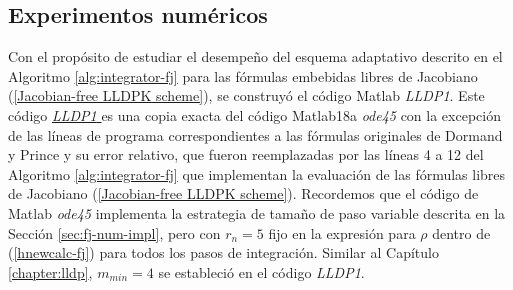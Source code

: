 \subsection{Experimentos numéricos}
Con el propósito de estudiar el desempeño del esquema adaptativo descrito en el Algoritmo \ref{alg:integrator-fj} para las fórmulas embebidas libres de Jacobiano (\ref{Jacobian-free LLDPK scheme}), se construyó el código Matlab \emph{LLDP1}. Este código \href{https://github.com/fsadannn/JF-LLDPschemes}{{\emph{LLDP1} \faExternalLink}} es una copia exacta del código Matlab18a \emph{ode45} \cite{shampine1997matlab} con la excepción de las líneas de programa correspondientes a las fórmulas originales de Dormand y Prince y su error relativo, que fueron reemplazadas por las líneas 4 a 12 del Algoritmo \ref{alg:integrator-fj} que implementan la evaluación de las fórmulas libres de Jacobiano (\ref{Jacobian-free LLDPK scheme}). Recordemos que el código de Matlab \emph{ode45} implementa la estrategia de tamaño de paso variable descrita en la Sección \ref{sec:fj-num-impl}, pero con $r_n=5$ fijo en la expresión para $\rho$ dentro de (\ref{hnewcalc-fj}) para todos los pasos de integración. Similar al Capítulo \ref{chapter:lldp}, $m_{min}=4$ se estableció en el código \emph{LLDP1}.

